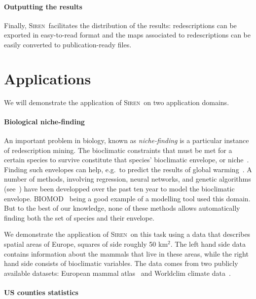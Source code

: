 \documentclass{sig-alternate}
\newcommand{\prg}[1]{\paragraph{#1}}
\newcommand{\Siren}{\textsc{Siren}}
\begin{document}

\prg{Outputting the results}
\label{sec:outputting-results}
Finally, \Siren\ facilitates the distribution of the results:
redescriptions can be exported in easy-to-read format and the
maps associated to redescriptions can be easily converted to
publication-ready files. 

\section{Applications}
We will demonstrate the application of \Siren\ on two application domains. 

\prg{Biological niche-finding}
An important problem in biology, known as \emph{niche-finding} is a
particular instance of redescription mining.  The bioclimatic
constraints that must be met for a certain species to survive
constitute that species' bioclimatic envelope, or niche~\cite{grinnell17niche}.  Finding such
envelopes can help, e.g.\ to predict the results of global
warming~\cite{pearson03predicting}.  A number of methods, involving
regression, neural networks, and genetic algorithms
(see~\cite{soberon05interpretation}) have been developped over the
past ten year to model the bioclimatic envelope.
\textsc{BIOMOD}~\cite{thuiller09biomod} being a good example of
a modelling tool used this domain.  But to the best of our
knowledge, none of these methods allows automatically finding both the
set of species and their envelope.

We demonstrate the application of \Siren\ on this task using a data
that describes spatial areas of Europe, squares of side roughly 50
km$^2$.  The left hand side data contains information about the
mammals that live in these areas, while the right hand side consists
of bioclimatic variables. The data comes from two publicly available
datasets: European mammal atlas~\cite{mitchell-jones99atlas} and
Worldclim climate data~\cite{hijmans05very}.

\prg{US counties statistics}

\end{document}
